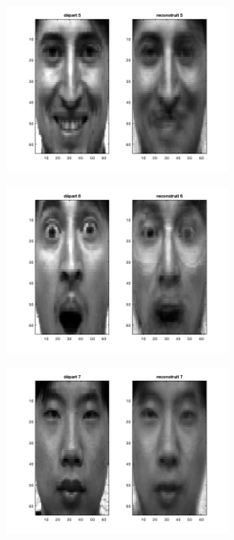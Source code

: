 \documentclass[a4paper]{article}
\begin{document}
\begin{figure}[H]
    \begin{subfigure}[c]{0.24\textwidth}
        \centering
        \includegraphics[width=0.8\textwidth]{images/ex5_face5.png}
    \end{subfigure}    
    \begin{subfigure}[c]{0.24\textwidth}
        \centering
        \includegraphics[width=0.8\textwidth]{images/ex5_face6.png}
    \end{subfigure}    
    \begin{subfigure}[c]{0.24\textwidth}
        \centering
        \includegraphics[width=0.8\textwidth]{images/ex5_face7.png}

\end{subfigure}
\end{figure}
\end{document}
